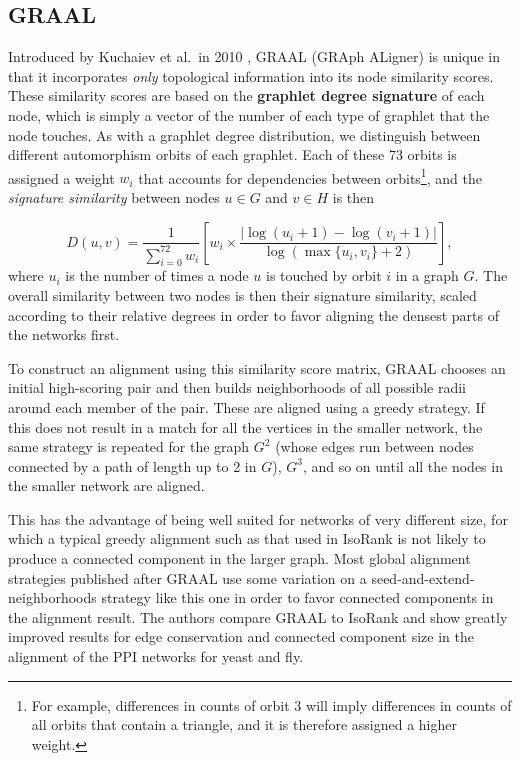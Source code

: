 \documentclass[12pt]{thesis}
\theoremstyle{plain}
\theoremstyle{definition}
\theoremstyle{remark}
\begin{document}
\subsection{GRAAL}

Introduced by Kuchaiev et al.\ in 2010 \cite{Kuchaiev_2010}, GRAAL (GRAph ALigner) is unique in that it incorporates \textit{only} topological information into its node similarity scores. These similarity scores are based on the \textbf{graphlet degree signature} of each node, which is simply a vector of the number of each type of graphlet that the node touches. As with a graphlet degree distribution, we distinguish between different automorphism orbits of each graphlet. Each of these 73 orbits is assigned a weight $w_i$ that accounts for dependencies between orbits\footnote{For example, differences in counts of orbit 3 will imply differences in counts of all orbits that contain a triangle, and it is therefore assigned a higher weight.}, and the \textit{signature similarity} between nodes $u\in G$ and $v\in H$ is then

\[D(u,v) = \frac{1}{\sum_{i=0}^{72} w_i} \left[ w_i \times \frac{|\log(u_i + 1) - \log(v_i+1) |}{\log (\max\{u_i, v_i\} + 2)} \right], \]
where $u_i$ is the number of times a node $u$ is touched by orbit $i$ in a graph $G$. The overall similarity between two nodes is then their signature similarity, scaled according to their relative degrees in order to favor aligning the densest parts of the networks first.

To construct an alignment using this similarity score matrix, GRAAL chooses an initial high-scoring pair and then builds neighborhoods of all possible radii around each member of the pair. These are aligned using a greedy strategy. If this does not result in a match for all the vertices in the smaller network, the same strategy is repeated for the graph $G^2$ (whose edges run between nodes connected by a path of length up to 2 in $G$), $G^3$, and so on until all the nodes in the smaller network are aligned.

This has the advantage of being well suited for networks of very different size, for which a typical greedy alignment such as that used in IsoRank is not likely to produce a connected component in the larger graph. Most global alignment strategies published after GRAAL use some variation on a seed-and-extend-neighborhoods strategy like this one in order to favor connected components in the alignment result. The authors compare GRAAL to IsoRank and show greatly improved results for edge conservation and connected component size in the alignment of the PPI networks for yeast and fly.
\end{document}
